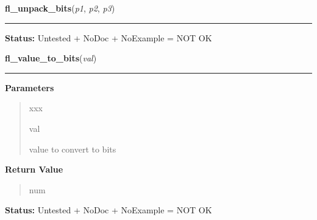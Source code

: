     \vspace{0.5ex}

\hspace{.8\funcindent}\begin{boxedminipage}{\funcwidth}

    \raggedright \textbf{fl\_unpack\_bits}(\textit{p1}, \textit{p2}, \textit{p3})

    \vspace{-1.5ex}

    \rule{\textwidth}{0.5\fboxrule}
\setlength{\parskip}{2ex}
\setlength{\parskip}{1ex}
\textbf{Status:} Untested + NoDoc + NoExample = NOT OK



    \end{boxedminipage}

    \label{xformslib:library:fl_value_to_bits}

    \vspace{0.5ex}

\hspace{.8\funcindent}\begin{boxedminipage}{\funcwidth}

    \raggedright \textbf{fl\_value\_to\_bits}(\textit{val})

    \vspace{-1.5ex}

    \rule{\textwidth}{0.5\fboxrule}
\setlength{\parskip}{2ex}
\setlength{\parskip}{1ex}
      \textbf{Parameters}
      \vspace{-1ex}

      \begin{quote}
        \begin{Ventry}{xxx}

          \item[val]

          value to convert to bits

        \end{Ventry}

      \end{quote}

      \textbf{Return Value}
    \vspace{-1ex}

      \begin{quote}
      num

      \end{quote}

\textbf{Status:} Untested + NoDoc + NoExample = NOT OK



    \end{boxedminipage}

